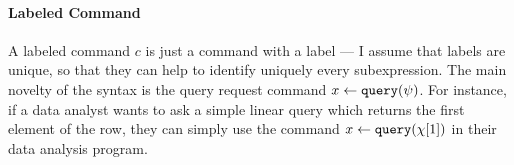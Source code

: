 \paragraph{Labeled Command}
 A labeled command $c$ is just a command with a label --- I assume that labels are unique, so that they can help to identify uniquely every subexpression. 
 The main novelty of the syntax is the query request command $\mathrel{ x \leftarrow {\tt query}(\psi) }$. 
 For instance, if a data analyst wants to ask a simple linear query which returns the first element of the row, 
 they can simply use the command $ \mathrel{ x \leftarrow {\tt query}(\chi[1]) }$ in their data analysis program.
%
